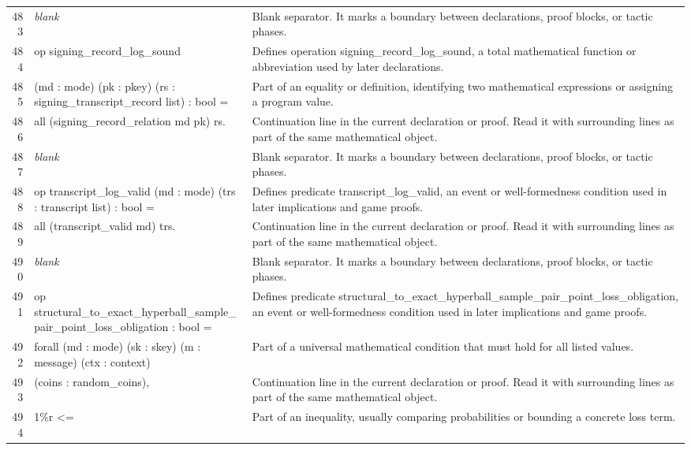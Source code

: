 \documentclass[10pt]{article}
\begin{document}
\begin{longtable}{r L{0.53\textwidth} L{0.37\textwidth}}
483 & {\ttfamily\scriptsize \emph{blank}} & Blank separator.  It marks a boundary between declarations, proof blocks, or tactic phases. \\
484 & {\ttfamily\scriptsize op signing\_record\_log\_sound} & Defines operation signing\_record\_log\_sound, a total mathematical function or abbreviation used by later declarations. \\
485 & {\ttfamily\scriptsize    (md : mode) (pk : pkey) (rs : signing\_transcript\_record list) : bool =} & Part of an equality or definition, identifying two mathematical expressions or assigning a program value. \\
486 & {\ttfamily\scriptsize   all (signing\_record\_relation md pk) rs.} & Continuation line in the current declaration or proof.  Read it with surrounding lines as part of the same mathematical object. \\
487 & {\ttfamily\scriptsize \emph{blank}} & Blank separator.  It marks a boundary between declarations, proof blocks, or tactic phases. \\
488 & {\ttfamily\scriptsize op transcript\_log\_valid (md : mode) (trs : transcript list) : bool =} & Defines predicate transcript\_log\_valid, an event or well-formedness condition used in later implications and game proofs. \\
489 & {\ttfamily\scriptsize   all (transcript\_valid md) trs.} & Continuation line in the current declaration or proof.  Read it with surrounding lines as part of the same mathematical object. \\
490 & {\ttfamily\scriptsize \emph{blank}} & Blank separator.  It marks a boundary between declarations, proof blocks, or tactic phases. \\
491 & {\ttfamily\scriptsize op structural\_to\_exact\_hyperball\_sample\_pair\_point\_loss\_obligation : bool =} & Defines predicate structural\_to\_exact\_hyperball\_sample\_pair\_point\_loss\_obligation, an event or well-formedness condition used in later implications and game proofs. \\
492 & {\ttfamily\scriptsize   forall (md : mode) (sk : skey) (m : message) (ctx : context)} & Part of a universal mathematical condition that must hold for all listed values. \\
493 & {\ttfamily\scriptsize          (coins : random\_coins),} & Continuation line in the current declaration or proof.  Read it with surrounding lines as part of the same mathematical object. \\
494 & {\ttfamily\scriptsize     1\%r <=} & Part of an inequality, usually comparing probabilities or bounding a concrete loss term. \\

\end{longtable}
\end{document}
